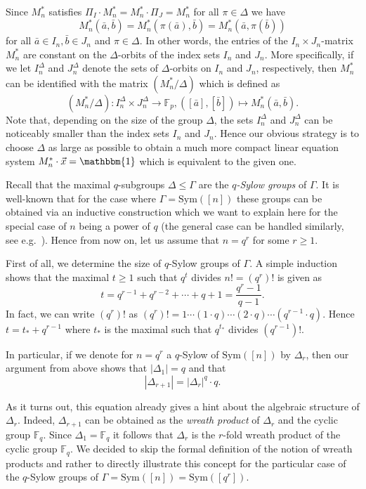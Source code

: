 \documentclass[a4paper,UKenglish]{lipics}
\newcommand{\inseg}[1]{\ensuremath{[#1]}}
\newcommand{\card}[1]{\ensuremath{|#1|}}
\newcommand{\field}[1]{\mathbb{#1}}
\newcommand{\Sym}{\ensuremath{\text{Sym}}\xspace}
\newcommand{\onevec}{\ensuremath{\mathbbm{1}}}
\newcommand{\ba}{{\bar a}}
\newcommand{\bb}{{\bar b}}
\theoremstyle{plain}
\begin{document}
\smallskip
Since $M_n^*$ satisfies $\Pi_I \cdot M_n^* = M_n^* \cdot \Pi_J = M_n^*$ for
all $\pi \in \Delta$ we have 
\[ M_n^*(\ba,\bb) = M_n^*(\pi (\ba), \bb) = M_n^*(\ba,\pi(\bb)) \] for all $\ba
\in I_n, \bb \in J_n$ and $\pi \in \Delta$.
In other words, the entries of the $I_n\times J_n$-matrix $M_n^*$ are constant 
on the $\Delta$-orbits of the index sets $I_n$ and $J_n$. 
More specifically, if we let $I_n^\Delta$ and $J_n^\Delta$ denote the sets of
$\Delta$-orbits on $I_n$ and $J_n$, respectively, then $M_n^*$ can
be identified with the matrix $(M_n^* / \Delta)$ which is defined as 
\[ (M_n^* / \Delta): I_n^\Delta \times J_n^\Delta \to \field F_p,
([\ba],[\bb]) \mapsto M_n^*(\ba,\bb).\]
Note that, depending on the size of the group $\Delta$, the sets 
$I_n^\Delta$ and $J_n^\Delta$ can be noticeably smaller than the index 
sets $I_n$ and $J_n$. 
Hence our obvious strategy is to choose $\Delta$ as large as 
possible to obtain a much more compact linear equation system $M_n^* \cdot 
\vec x = \onevec$ which is  equivalent to the given one.

\medskip
Recall that the maximal $q$-subgroups $\Delta \leq \Gamma$  are 
 the \emph{$q$-Sylow groups} of $\Gamma$. 
It is well-known that for the case where $\Gamma=\Sym({\inseg n})$ these 
groups can be obtained via an inductive construction which we
want to explain here for the special case of $n$ being a power of $q$ (the 
general case can be handled similarly, see e.g.~\cite{Ha76}). Hence from 
now on, let us assume that $n = q^r$ for some $r \geq 1$.

First of all, we determine the size of $q$-Sylow groups of 
$\Gamma$. A simple induction shows that
the maximal $t \geq 1$ such that $q^t$  divides 
$n! = (q^r)!$
is given as
\[ t = q^{r-1} + q^{r-2} + \cdots + q + 1 = \frac{q^r-1}{q-1}.\]
In fact, we can write $(q^r)!$ as $(q^r)! = 1 \cdots (1 \cdot q) \cdots (2 \cdot
q) \cdots (q^{r-1} \cdot q)$.
Hence $t = t_* + q^{r-1}$ where $t_*$ is the maximal such that $q^{t_*}$
divides $(q^{r-1})!$.

In particular, if we denote for $n = q^r$ a $q$-Sylow of $\Sym(\inseg{n})$
by $\Delta_r$, then our argument from above shows that $\card{\Delta_1} =
q$ and that
\[ \card{\Delta_{r+1}} = \card{\Delta_r}^q \cdot q. \]

As it turns out, this equation already gives a hint about the algebraic
structure of $\Delta_r$. Indeed, $\Delta_{r+1}$ can be obtained as the 
\emph{wreath product} of 
$\Delta_{r}$ and the cyclic group $\field F_q$. Since $\Delta_1 = \field F_q$ 
it 
follows that $\Delta_r$ is the $r$-fold wreath product of the 
cyclic group $\field F_q$. We
decided to skip the
formal definition of the notion of wreath products and rather to directly
illustrate this concept for the particular case of the $q$-Sylow groups of 
$\Gamma = \Sym(\inseg n) = \Sym(\inseg {q^r})$.
\end{document}
